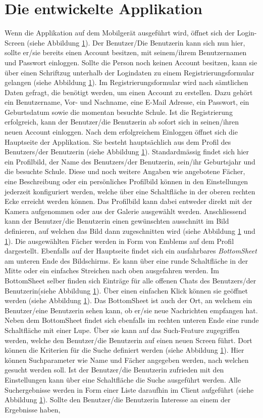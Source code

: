 \documentclass[a4paper,11pt]{report}
\begin{document}
	\section{Die entwickelte Applikation}%
	Wenn die Applikation auf dem Mobilgerät ausgeführt wird, öffnet sich der Login-Screen (siehe Abbildung \ref{}). Der Benutzer/Die Benutzerin kann sich nun hier, sollte er/sie bereits einen Account besitzen, mit seinem/ihrem Benutzernamen und Passwort einloggen. Sollte die Person noch keinen Account besitzen, kann sie über einen Schriftzug unterhalb der Logindaten zu einem Registrierungsformular gelangen (siehe Abbildung \ref{}). Im Registrierungsformular wird nach sämtlichen Daten gefragt, die benötigt werden, um einen Account zu erstellen. Dazu gehört ein Benutzername, Vor- und Nachname, eine E-Mail Adresse, ein Passwort, ein Geburtsdatum sowie die momentan besuchte Schule. Ist die Registrierung erfolgreich, kann der Benutzer/die Benutzerin ab sofort sich in seinen/ihren neuen Account einloggen. Nach dem erfolgreichem Einloggen öffnet sich die Hauptseite der Applikation. Sie besteht hauptsächlich aus dem Profil des Benutzers/der Benutzerin (siehe Abbildung \ref{}). Standardmässig findet sich hier ein Profilbild, der Name des Benutzers/der Benutzerin, sein/ihr Geburtsjahr und die besuchte Schule. Diese und noch weitere Angaben wie angebotene Fächer, eine Beschreibung oder ein persönliches Profilbild können in den Einstellungen jederzeit konfiguriert werden, welche über eine Schaltfläche in der oberen rechten Ecke erreicht werden können. Das Profilbild kann dabei entweder direkt mit der Kamera aufgenommen oder aus der Galerie ausgewählt werden. Anschliessend kann der Benutzer/die Benutzerin einen gewünschten ausschnitt im Bild definieren, auf welchen das Bild dann zugeschnitten wird (siehe Abbildung \ref{} und \ref{}). Die ausgewählten Fächer werden in Form von Emblems auf dem Profil dargestellt. Ebenfalls auf der Hauptseite findet sich ein ausfahrbares \emph{BottomSheet} am unteren Ende des Bildschirms. Es kann über eine runde Schaltfläche in der Mitte oder ein einfaches Streichen nach oben ausgefahren werden. Im BottomSheet selber finden sich Einträge für alle offenen Chats des Benutzers/der Benutzerin(siehe Abbildung \ref{}). Über einen einfachen Klick können sie geöffnet werden (siehe Abbildung \ref{}). Das BottomSheet ist auch der Ort, an welchem ein Benutzer/eine Benutzerin sehen kann, ob er/sie neue Nachrichten empfangen hat. Neben dem BottomSheet findet sich ebenfalls im rechten unteren Ende eine runde Schaltfläche mit einer Lupe. Über sie kann auf das Such-Feature zugegriffen werden, welche den Benutzer/die Benutzerin auf einen neuen Screen führt. Dort können die Kriterien für die Suche definiert werden (siehe Abbildung \ref{}). Hier können Suchparameter wie Name und Fächer angegeben werden, nach welchen gesucht werden soll. Ist der Benutzer/die Benutzerin zufrieden mit den Einstellungen kann über eine Schaltfläche die Suche ausgeführt werden. Alle Suchergebnisse werden in Form einer Liste daraufhin im Client aufgeführt (siehe Abbildung \ref{}). Sollte den Benutzer/die Benutzerin Interesse an einem der Ergebnisse haben, 
\end{document}
